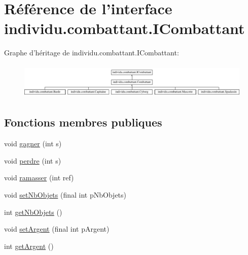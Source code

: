 \hypertarget{interfaceindividu_1_1combattant_1_1_i_combattant}{\section{Référence de l'interface individu.\-combattant.\-I\-Combattant}
\label{interfaceindividu_1_1combattant_1_1_i_combattant}
}
Graphe d'héritage de individu.\-combattant.\-I\-Combattant\-:\begin{figure}[H]
\begin{center}
\leavevmode
\includegraphics[height=1.705584cm]{interfaceindividu_1_1combattant_1_1_i_combattant}
\end{center}
\end{figure}
\subsection*{Fonctions membres publiques}
\begin{DoxyCompactItemize}
\item 
void \hyperlink{interfaceindividu_1_1combattant_1_1_i_combattant_a8b656cde577f3346cee0f75450cbcb42}{gagner} (int s)
\item 
void \hyperlink{interfaceindividu_1_1combattant_1_1_i_combattant_a762a6a778b7a09fa32564e6dd9e0aa46}{perdre} (int s)
\item 
void \hyperlink{interfaceindividu_1_1combattant_1_1_i_combattant_a48e6090fc4b67a81a8028477ea6b15e7}{ramasser} (int ref)
\item 
void \hyperlink{interfaceindividu_1_1combattant_1_1_i_combattant_aca0de8e3df27d07ceb216e022c403cc6}{set\-Nb\-Objets} (final int p\-Nb\-Objets)
\item 
int \hyperlink{interfaceindividu_1_1combattant_1_1_i_combattant_abf39b472bad06221d901d2d143ee5c91}{get\-Nb\-Objets} ()
\item 
void \hyperlink{interfaceindividu_1_1combattant_1_1_i_combattant_abaa834896ead5ad778a23edaccf61148}{set\-Argent} (final int p\-Argent)
\item 
int \hyperlink{interfaceindividu_1_1combattant_1_1_i_combattant_a820ac1fbe763b07ae4300a58f6fc0463}{get\-Argent} ()
\end{DoxyCompactItemize}



